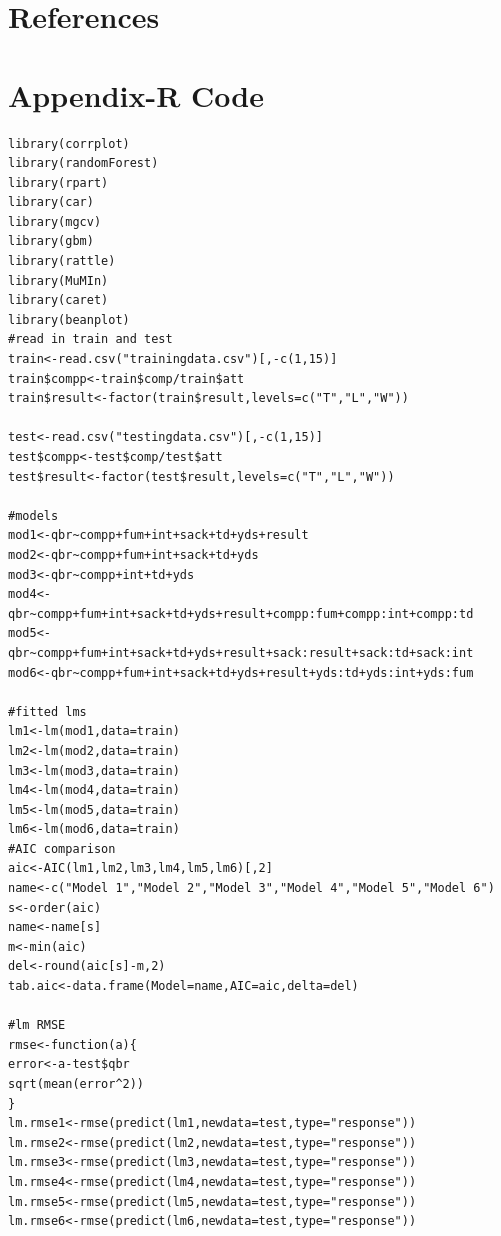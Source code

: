 \documentclass[12pt]{article}\usepackage[]{graphicx}\usepackage[]{color}
\begin{document}
\nocite{*}

\newpage
\section{References}
\begin{flushleft}


\end{flushleft}

\newpage
\section{Appendix-R Code}
\singlespacing
\begin{lstlisting}
library(corrplot)
library(randomForest)
library(rpart)
library(car)
library(mgcv)
library(gbm)
library(rattle)
library(MuMIn)
library(caret)
library(beanplot)
#read in train and test
train<-read.csv("trainingdata.csv")[,-c(1,15)]
train$compp<-train$comp/train$att
train$result<-factor(train$result,levels=c("T","L","W"))

test<-read.csv("testingdata.csv")[,-c(1,15)]
test$compp<-test$comp/test$att
test$result<-factor(test$result,levels=c("T","L","W"))

#models
mod1<-qbr~compp+fum+int+sack+td+yds+result
mod2<-qbr~compp+fum+int+sack+td+yds
mod3<-qbr~compp+int+td+yds
mod4<-qbr~compp+fum+int+sack+td+yds+result+compp:fum+compp:int+compp:td
mod5<-qbr~compp+fum+int+sack+td+yds+result+sack:result+sack:td+sack:int
mod6<-qbr~compp+fum+int+sack+td+yds+result+yds:td+yds:int+yds:fum

#fitted lms
lm1<-lm(mod1,data=train)
lm2<-lm(mod2,data=train)
lm3<-lm(mod3,data=train)
lm4<-lm(mod4,data=train)
lm5<-lm(mod5,data=train)
lm6<-lm(mod6,data=train)
#AIC comparison
aic<-AIC(lm1,lm2,lm3,lm4,lm5,lm6)[,2]
name<-c("Model 1","Model 2","Model 3","Model 4","Model 5","Model 6")
s<-order(aic)
name<-name[s]
m<-min(aic)
del<-round(aic[s]-m,2)
tab.aic<-data.frame(Model=name,AIC=aic,delta=del)

#lm RMSE
rmse<-function(a){
error<-a-test$qbr
sqrt(mean(error^2))
}
lm.rmse1<-rmse(predict(lm1,newdata=test,type="response"))
lm.rmse2<-rmse(predict(lm2,newdata=test,type="response"))
lm.rmse3<-rmse(predict(lm3,newdata=test,type="response"))
lm.rmse4<-rmse(predict(lm4,newdata=test,type="response"))
lm.rmse5<-rmse(predict(lm5,newdata=test,type="response"))
lm.rmse6<-rmse(predict(lm6,newdata=test,type="response"))


\end{lstlisting}
\end{document}
